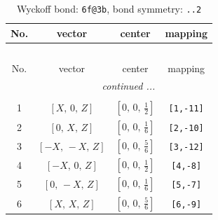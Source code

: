 \documentclass[fleqn,8pt]{jsarticle}
\begin{document}
\begin{longtable}{cccc}
\caption{Wyckoff bond: {\tt 6f@3b}, bond symmetry: {\tt ..2}}
 \\
 \hline \hline
No. & vector & center & mapping \\ \hline \endfirsthead

\multicolumn{3}{l}{\tablename\ \thetable{}} \\
 \hline \hline
No. & vector & center & mapping \\ \hline \endhead

 \hline \hline
\multicolumn{3}{r}{\footnotesize\it continued ...} \\ \endfoot

 \hline \hline
\multicolumn{3}{r}{} \\ \endlastfoot

1 & $\left[ X,\, 0,\, Z \right]$ & $\left[ 0,\, 0,\, \frac{1}{2} \right]$ & {\tt [1,-11]} \\ \hline
2 & $\left[ 0,\, X,\, Z \right]$ & $\left[ 0,\, 0,\, \frac{1}{6} \right]$ & {\tt [2,-10]} \\ \hline
3 & $\left[ - X,\, - X,\, Z \right]$ & $\left[ 0,\, 0,\, \frac{5}{6} \right]$ & {\tt [3,-12]} \\ \hline
4 & $\left[ - X,\, 0,\, Z \right]$ & $\left[ 0,\, 0,\, \frac{1}{2} \right]$ & {\tt [4,-8]} \\ \hline
5 & $\left[ 0,\, - X,\, Z \right]$ & $\left[ 0,\, 0,\, \frac{1}{6} \right]$ & {\tt [5,-7]} \\ \hline
6 & $\left[ X,\, X,\, Z \right]$ & $\left[ 0,\, 0,\, \frac{5}{6} \right]$ & {\tt [6,-9]} \\
\end{longtable}
\renewcommand{\arraystretch}{1.2}
\end{document}
